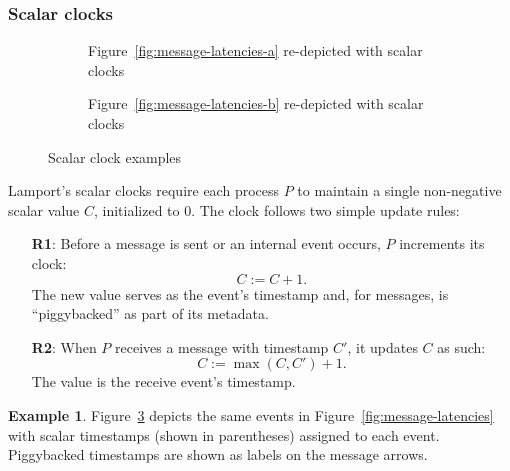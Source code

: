 \documentclass[]             %
{NASA}                       %
\theoremstyle{definition}
\newtheorem{example}[theorem]{Example}
\begin{document}
\subsubsection{Scalar clocks}
\label{sssec:scalar-clocks}
\begin{figure}
  \setlength\belowcaptionskip{5ex}

  \begin{subfigure}{1\textwidth}
    \centering 
    \caption{Figure~\ref{fig:message-latencies-a} re-depicted with scalar clocks}
    \label{fig:message-latencies-scalar-a}
  \end{subfigure}

  \begin{subfigure}{1\textwidth}
    \centering 
    \caption{Figure~\ref{fig:message-latencies-b} re-depicted with scalar clocks}
    \label{fig:message-latencies-scalar-b}
  \end{subfigure}

  \caption{Scalar clock examples}
  \label{fig:message-latencies-scalar}
\end{figure}

Lamport's scalar clocks \cite{1978:lamportclocks} require each
process $P$ to maintain a single non-negative scalar value $C$,
initialized to $0$. The clock follows two simple update rules:
\begin{enumerate}
\item[\textbf{R1}:] Before a message is sent or an internal event occurs, $P$
  increments its clock:
  \[C := C + 1.\]
  The new value serves as the event's timestamp and, for messages, is ``piggybacked''
  as part of its metadata.
\item[\textbf{R2}:] When $P$ receives a message with timestamp $C'$, it
  updates $C$ as such:
  \[C := \max(C, C') + 1.\]
  The value is the receive event's timestamp.
\end{enumerate}

\begin{example}
  Figure~\ref{fig:message-latencies-scalar} depicts the same events in
  Figure~\ref{fig:message-latencies} with scalar timestamps (shown in
  parentheses) assigned to each event. Piggybacked timestamps are
  shown as labels on the message arrows.
\end{example}
\end{document}
